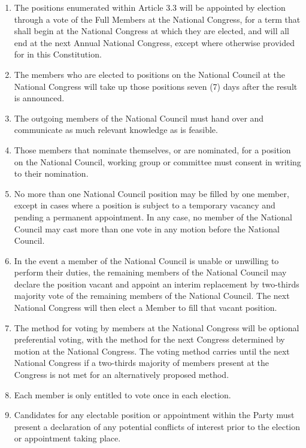 \documentclass[a4paper,titlepage,8.5pt]{article}
\begin{document}
\begin{enumerate}
\item The positions enumerated within Article 3.3 will be appointed by election through a vote of the Full Members at the National Congress, for a term that shall begin at the National Congress at which they are elected, and will all end at the next Annual National Congress, except where otherwise provided for in this Constitution.
\item The members who are elected to positions on the National Council at the National Congress will take up those positions seven (7) days after the result is announced.
\item The outgoing members of the National Council must hand over and communicate as much relevant knowledge as is feasible.
\item Those members that nominate themselves, or are nominated, for a position on the National Council, working group or committee must consent in writing to their nomination.
\item No more than one National Council position may be filled by one member, except in cases where a position is subject to a temporary vacancy and pending a permanent appointment. In any case, no member of the National Council may cast more than one vote in any motion before the National Council.
\item In the event a member of the National Council is unable or unwilling to perform their duties, the remaining members of the National Council may declare the position vacant and appoint an interim replacement by two-thirds majority vote of the remaining members of the National Council. The next National Congress will then elect a Member to fill that vacant position.
\item The method for voting by members at the National Congress will be optional preferential voting, with the method for the next Congress determined by motion at the National Congress. The voting method carries until the next National Congress if a two-thirds majority of members present at the Congress is not met for an alternatively proposed method.
\item Each member is only entitled to vote once in each election.
\item Candidates for any electable position or appointment within the Party must present a declaration of any potential conflicts of interest prior to the election or appointment taking place.
\end{enumerate}
\end{document}
